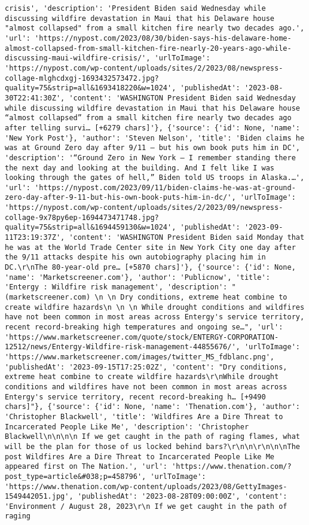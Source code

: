 \documentclass[
  letterpaper,
  DIV=11,
  numbers=noendperiod]{scrartcl}
\begin{document}
\begin{verbatim}
crisis', 'description': 'President Biden said Wednesday while discussing wildfire devastation in Maui that his Delaware house "almost collapsed" from a small kitchen fire nearly two decades ago.', 'url': 'https://nypost.com/2023/08/30/biden-says-his-delaware-home-almost-collapsed-from-small-kitchen-fire-nearly-20-years-ago-while-discussing-maui-wildfire-crisis/', 'urlToImage': 'https://nypost.com/wp-content/uploads/sites/2/2023/08/newspress-collage-mlghcdxgj-1693432573472.jpg?quality=75&strip=all&1693418220&w=1024', 'publishedAt': '2023-08-30T22:41:30Z', 'content': 'WASHINGTON President Biden said Wednesday while discussing wildfire devastation in Maui that his Delaware house “almost collapsed” from a small kitchen fire nearly two decades ago after telling survi… [+6279 chars]'}, {'source': {'id': None, 'name': 'New York Post'}, 'author': 'Steven Nelson', 'title': 'Biden claims he was at Ground Zero day after 9/11 — but his own book puts him in DC', 'description': '“Ground Zero in New York — I remember standing there the next day and looking at the building. And I felt like I was looking through the gates of hell,” Biden told US troops in Alaska.…', 'url': 'https://nypost.com/2023/09/11/biden-claims-he-was-at-ground-zero-day-after-9-11-but-his-own-book-puts-him-in-dc/', 'urlToImage': 'https://nypost.com/wp-content/uploads/sites/2/2023/09/newspress-collage-9x78py6ep-1694473471748.jpg?quality=75&strip=all&1694459130&w=1024', 'publishedAt': '2023-09-11T23:19:37Z', 'content': 'WASHINGTON President Biden said Monday that he was at the World Trade Center site in New York City one day after the 9/11 attacks despite his own autobiography placing him in DC.\r\nThe 80-year-old pre… [+5870 chars]'}, {'source': {'id': None, 'name': 'Marketscreener.com'}, 'author': 'Publicnow', 'title': 'Entergy : Wildfire risk management', 'description': "(marketscreener.com) \n \n Dry conditions, extreme heat combine to create wildfire hazards\n \n \n While drought conditions and wildfires have not been common in most areas across Entergy's service territory, recent record-breaking high temperatures and ongoing se…", 'url': 'https://www.marketscreener.com/quote/stock/ENTERGY-CORPORATION-12512/news/Entergy-Wildfire-risk-management-44855676/', 'urlToImage': 'https://www.marketscreener.com/images/twitter_MS_fdblanc.png', 'publishedAt': '2023-09-15T17:25:02Z', 'content': "Dry conditions, extreme heat combine to create wildfire hazards\r\nWhile drought conditions and wildfires have not been common in most areas across Entergy's service territory, recent record-breaking h… [+9490 chars]"}, {'source': {'id': None, 'name': 'Thenation.com'}, 'author': 'Christopher Blackwell', 'title': 'Wildfires Are a Dire Threat to Incarcerated People Like Me', 'description': 'Christopher Blackwell\n\n\n\n If we get caught in the path of raging flames, what will be the plan for those of us locked behind bars?\r\n\n\r\n\n\nThe post Wildfires Are a Dire Threat to Incarcerated People Like Me appeared first on The Nation.', 'url': 'https://www.thenation.com/?post_type=article&#038;p=458796', 'urlToImage': 'https://www.thenation.com/wp-content/uploads/2023/08/GettyImages-1549442051.jpg', 'publishedAt': '2023-08-28T09:00:00Z', 'content': 'Environment / August 28, 2023\r\n If we get caught in the path of raging 
\end{verbatim}
\end{document}

